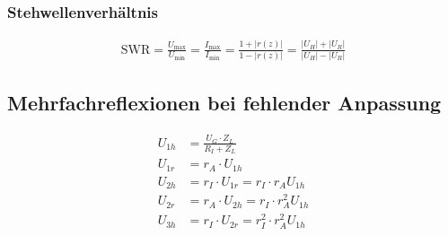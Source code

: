 \subsubsection{Stehwellenverhältnis}
\begin{align*}
    \mathrm{SWR} = \frac{U_\text{max}}{U_\text{min}} =
    \frac{I_\text{max}}{I_\text{min}} = \frac{1+|r(z)|}{1-|r(z)|} =
    \frac{|U_H|+|U_R|}{|U_H|-|U_R|}
\end{align*}

\subsection{Mehrfachreflexionen bei fehlender Anpassung}


\begin{align*}
    U_{1h} & = \frac{U_G\cdot Z_L}{R_I + Z_L}            \\
    U_{1r} & = r_A\cdot U_{1h}                           \\
    U_{2h} & = r_I\cdot U_{1r} = r_I\cdot r_A U_{1h}     \\
    U_{2r} & = r_A\cdot U_{2h} = r_I\cdot r_A^2 U_{1h}   \\
    U_{3h} & = r_I\cdot U_{2r} = r_I^2\cdot r_A^2 U_{1h}
\end{align*}

